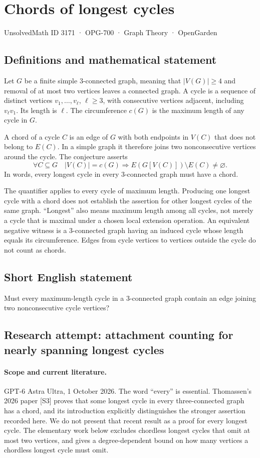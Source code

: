 \documentclass[11pt,a4paper]{article}
\begin{document}
\section*{Chords of longest cycles}\label{3171}
{\small UnsolvedMath ID 3171 · OPG-700 · Graph Theory · OpenGarden}
\subsection{Definitions and mathematical statement}
Let $G$ be a finite simple $3$-connected graph, meaning that
$|V(G)|\geq4$ and removal of at most two vertices leaves a
connected graph. A cycle is a sequence of distinct vertices
$v_1,\ldots,v_\ell$, $\ell\geq3$, with consecutive vertices
adjacent, including $v_\ell v_1$. Its length is $\ell$.
The circumference $c(G)$ is the maximum length of any cycle
in $G$.

A chord of a cycle $C$ is an edge of $G$ with both endpoints
in $V(C)$ that does not belong to $E(C)$. In a simple graph
it therefore joins two nonconsecutive vertices around the
cycle. The conjecture asserts
\[
 \forall C\subseteq G\quad
 |V(C)|=c(G)\Longrightarrow
 E(G[V(C)])\setminus E(C)\neq\varnothing.
\]
In words, every longest cycle in every $3$-connected graph
must have a chord.

The quantifier applies to every cycle of maximum length.
Producing one longest cycle with a chord does not establish
the assertion for other longest cycles of the same graph.
``Longest'' also means maximum length among all cycles,
not merely a cycle that is maximal under a chosen local
extension operation. An equivalent negative witness is a
$3$-connected graph having an induced cycle whose length
equals its circumference. Edges from cycle vertices to
vertices outside the cycle do not count as chords.
\subsection{Short English statement}
Must every maximum-length cycle in a 3-connected graph contain an edge joining two nonconsecutive cycle vertices?
\subsection{Research attempt: attachment counting for nearly spanning longest cycles}
\paragraph{Scope and current literature.}
GPT-6 Astra Ultra, 1 October 2026. The word ``every'' is essential.
Thomassen's 2026 paper [S3] proves that some longest cycle in every
three-connected graph has a chord, and its introduction explicitly
distinguishes the stronger assertion recorded here. We do not present
that recent result as a proof for every longest cycle. The elementary
work below excludes chordless longest cycles that omit at most two
vertices, and gives a degree-dependent bound on how many vertices a
chordless longest cycle must omit.
\end{document}
